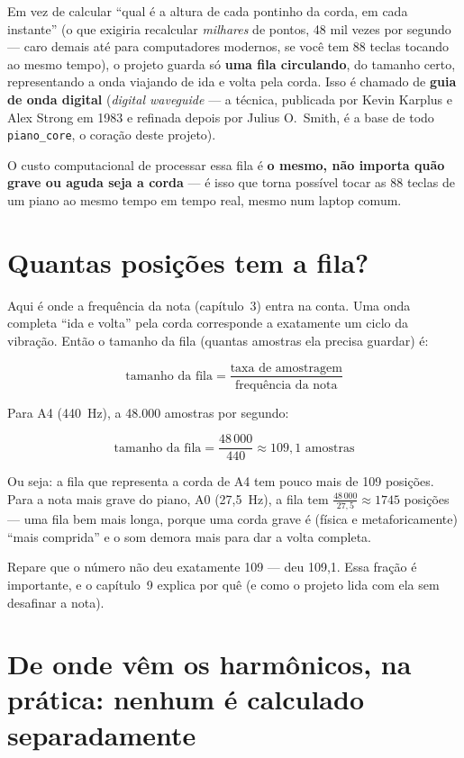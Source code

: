 \documentclass[11pt,oneside]{book}
\begin{document}
Em vez de calcular \enquote{qual é a altura de cada pontinho da corda, em
cada instante} (o que exigiria recalcular \emph{milhares} de pontos, 48 mil
vezes por segundo --- caro demais até para computadores modernos, se você
tem 88 teclas tocando ao mesmo tempo), o projeto guarda só \textbf{uma fila
circulando}, do tamanho certo, representando a onda viajando de ida e volta
pela corda. Isso é chamado de \textbf{guia de onda digital} (\emph{digital
waveguide} --- a técnica, publicada por Kevin Karplus e Alex Strong em
1983 e refinada depois por Julius O.\ Smith, é a base de todo
\texttt{piano\_core}, o coração deste projeto).

O custo computacional de processar essa fila é \textbf{o mesmo, não importa
quão grave ou aguda seja a corda} --- é isso que torna possível tocar as 88
teclas de um piano ao mesmo tempo em tempo real, mesmo num laptop comum.

\section*{Quantas posições tem a fila?}

Aqui é onde a frequência da nota (capítulo~3) entra na conta. Uma onda
completa \enquote{ida e volta} pela corda corresponde a exatamente um ciclo
da vibração. Então o tamanho da fila (quantas amostras ela precisa guardar)
é:

\[
\text{tamanho da fila} = \frac{\text{taxa de amostragem}}{\text{frequência da nota}}
\]

Para A4 (440~Hz), a 48.000 amostras por segundo:

\[
\text{tamanho da fila} = \frac{48\,000}{440} \approx 109{,}1 \text{ amostras}
\]

Ou seja: a fila que representa a corda de A4 tem pouco mais de 109
posições. Para a nota mais grave do piano, A0 (27,5~Hz), a fila tem
$\frac{48\,000}{27{,}5} \approx 1745$ posições --- uma fila bem mais longa,
porque uma corda grave é (física e metaforicamente) \enquote{mais comprida}
e o som demora mais para dar a volta completa.

Repare que o número não deu exatamente 109 --- deu 109,1. Essa fração é
importante, e o capítulo~9 explica por quê (e como o projeto lida com ela
sem desafinar a nota).

\section*{De onde vêm os harmônicos, na prática: nenhum é calculado
separadamente}
\end{document}
